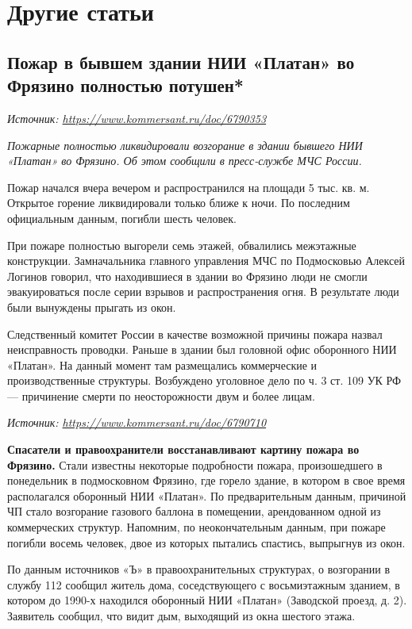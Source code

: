 \chapter{Другие статьи}

\section[Пожар в бывшем здании НИИ «Платан»*]{Пожар в бывшем здании НИИ «Платан» во Фрязино полностью потушен*}

\textit{Источник: \url{https://www.kommersant.ru/doc/6790353}}

\textit{Пожарные полностью ликвидировали возгорание в здании бывшего НИИ «Платан» во Фрязино. Об этом сообщили в пресс-службе МЧС России.}

Пожар начался вчера вечером и распространился на площади 5 тыс. кв. м. Открытое горение ликвидировали только ближе к ночи. По последним официальным данным, погибли шесть человек.

При пожаре полностью выгорели семь этажей, обвалились межэтажные конструкции. Замначальника главного управления МЧС по Подмосковью Алексей Логинов говорил, что находившиеся в здании во Фрязино люди не смогли эвакуироваться после серии взрывов и распространения огня. В результате люди были вынуждены прыгать из окон.

Следственный комитет России в качестве возможной причины пожара назвал неисправность проводки. Раньше в здании был головной офис оборонного НИИ «Платан». На данный момент там размещались коммерческие и производственные структуры. Возбуждено уголовное дело по ч. 3 ст. 109 УК РФ — причинение смерти по неосторожности двум и более лицам.

\textit{Источник: \url{https://www.kommersant.ru/doc/6790710}}

\textbf{Спасатели и правоохранители восстанавливают картину пожара во Фрязино.}
Стали известны некоторые подробности пожара, произошедшего в понедельник в подмосковном Фрязино, где горело здание, в котором в свое время располагался оборонный НИИ «Платан». По предварительным данным, причиной ЧП стало возгорание газового баллона в помещении, арендованном одной из коммерческих структур. Напомним, по неокончательным данным, при пожаре погибли восемь человек, двое из которых пытались спастись, выпрыгнув из окон.

По данным источников «Ъ» в правоохранительных структурах, о возгорании в службу 112 сообщил житель дома, соседствующего с восьмиэтажным зданием, в котором до 1990-х находился оборонный НИИ «Платан» (Заводской проезд, д. 2). Заявитель сообщил, что видит дым, выходящий из окна шестого этажа.

